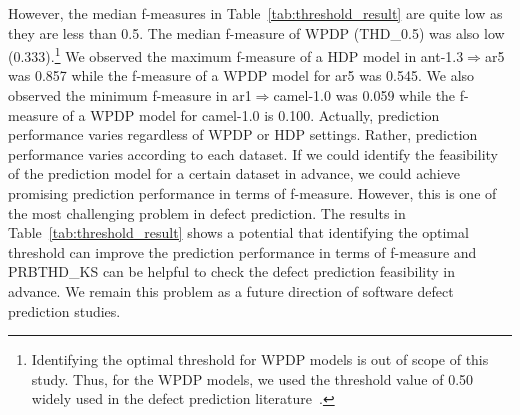 However, the median f-measures in Table~\ref{tab:threshold_result} are quite low as they are less than 0.5. The median f-measure of WPDP (THD\_0.5) was also low (0.333).\footnote{Identifying the optimal threshold for WPDP models is out of scope of this study. Thus, for the WPDP models, we used the threshold value of 0.50 widely used in the defect prediction literature~\cite{Lee11,Rahman13,Herzig13,Zimmermann09}.} We observed the maximum f-measure of a HDP model in ant-1.3$\Rightarrow$ar5 was 0.857 while the f-measure of a WPDP model for ar5 was 0.545. We also observed the minimum f-measure in ar1$\Rightarrow$camel-1.0 was 0.059 while the f-measure of a WPDP model for camel-1.0 is 0.100. Actually, prediction performance varies regardless of WPDP or HDP settings. Rather, prediction performance varies according to each dataset. If we could identify the feasibility of the prediction model for a certain dataset in advance, we could achieve promising prediction performance in terms of f-measure. However, this is one of the most challenging problem in defect prediction. The results in Table~\ref{tab:threshold_result} shows a potential that identifying the optimal threshold can improve the prediction performance in terms of f-measure and PRBTHD\_KS can be helpful to check the defect prediction feasibility in advance. We remain this problem as a future direction of software defect prediction studies.


